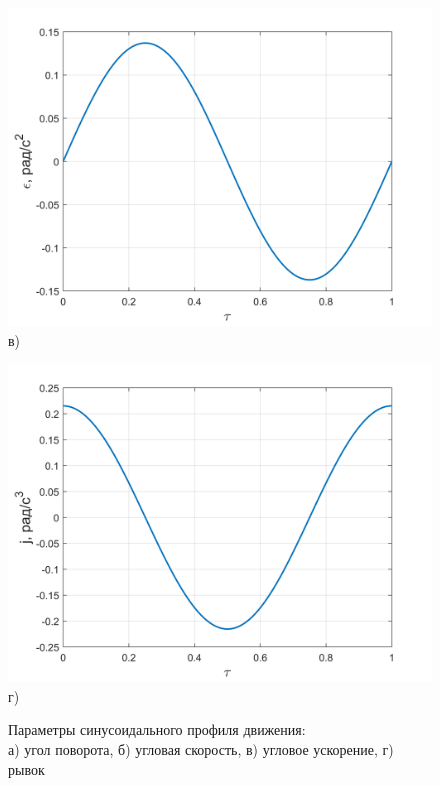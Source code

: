 \begin{figure}[h!]
	\begin{minipage}[b]{0.49\linewidth}\centering
		\includegraphics[width=\linewidth]{matlab/img/eps_sin} \\в) 
	\end{minipage}
	\hfill
	\begin{minipage}[b]{0.49\linewidth}\centering
		\includegraphics[width=\linewidth]{matlab/img/jerk_sin} \\г)  
	\end{minipage}
	
	\caption{Параметры синусоидального профиля движения:\\ а) угол поворота, б) угловая скорость, в) угловое ускорение, г) рывок}
	\label{fig:sin-profile}
\end{figure}

